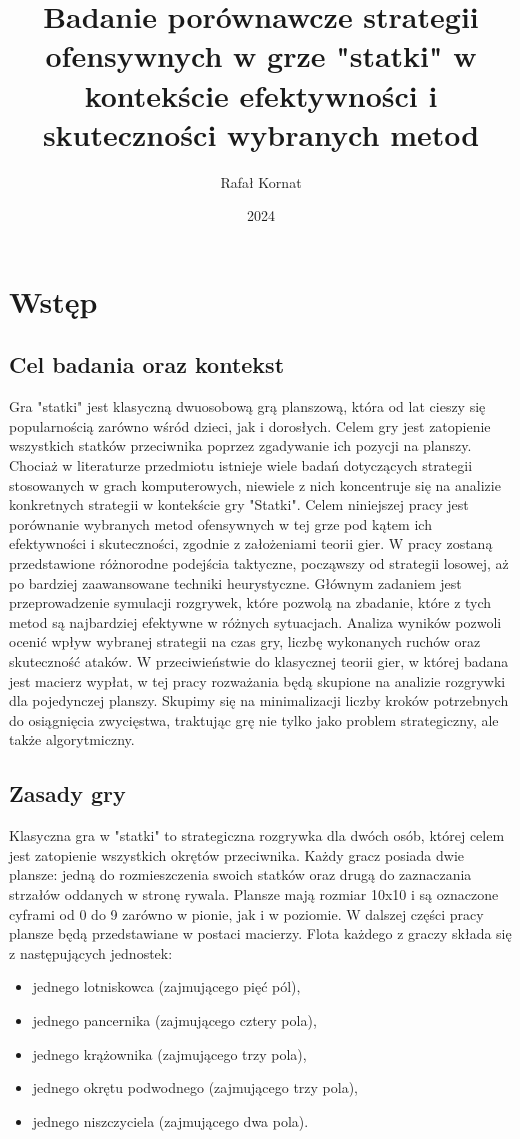 \documentclass[magisterska]{pracadypl}
\author{Rafał Kornat}
\title{Badanie porównawcze strategii ofensywnych w grze "statki" w kontekście efektywności i skuteczności wybranych metod}
\date{2024}
\begin{document}
\maketitle
\tableofcontents
\newpage


\chapter{Wstęp}

\section{Cel badania oraz kontekst}

Gra "statki" jest klasyczną dwuosobową grą planszową, która od lat cieszy się popularnością zarówno wśród dzieci, jak i dorosłych. Celem gry jest zatopienie wszystkich statków przeciwnika poprzez zgadywanie ich pozycji na planszy. Chociaż w literaturze przedmiotu istnieje wiele badań dotyczących strategii stosowanych w grach komputerowych, niewiele z nich koncentruje się na analizie konkretnych strategii w kontekście gry "Statki". Celem niniejszej pracy jest porównanie wybranych metod ofensywnych w tej grze pod kątem ich efektywności i skuteczności, zgodnie z założeniami teorii gier. W pracy zostaną przedstawione różnorodne podejścia taktyczne, począwszy od strategii losowej, aż po bardziej zaawansowane techniki heurystyczne. Głównym zadaniem jest przeprowadzenie symulacji rozgrywek, które pozwolą na zbadanie, które z tych metod są najbardziej efektywne w różnych sytuacjach. Analiza wyników pozwoli ocenić wpływ wybranej strategii na czas gry, liczbę wykonanych ruchów oraz skuteczność ataków. W przeciwieństwie do klasycznej teorii gier, w której badana jest macierz wypłat, w tej pracy rozważania będą skupione na analizie rozgrywki dla pojedynczej planszy. Skupimy się na minimalizacji liczby kroków potrzebnych do osiągnięcia zwycięstwa, traktując grę nie tylko jako problem strategiczny, ale także algorytmiczny.

\section{Zasady gry}
Klasyczna gra w "statki" to strategiczna rozgrywka dla dwóch osób, której celem jest zatopienie wszystkich okrętów przeciwnika. Każdy gracz posiada dwie plansze: jedną do rozmieszczenia swoich statków oraz drugą do zaznaczania strzałów oddanych w stronę rywala. Plansze mają rozmiar 10x10 i są oznaczone cyframi od 0 do 9 zarówno w pionie, jak i w poziomie. W dalszej części pracy plansze będą przedstawiane w postaci macierzy.
Flota każdego z graczy składa się z następujących jednostek: 
\begin{itemize}
    \item jednego lotniskowca (zajmującego pięć pól), 
    \item jednego pancernika (zajmującego cztery pola), 
    \item jednego krążownika (zajmującego trzy pola), 
    \item jednego okrętu podwodnego (zajmującego trzy pola), 
    \item jednego niszczyciela (zajmującego dwa pola). 
\end{itemize}
\end{document}
